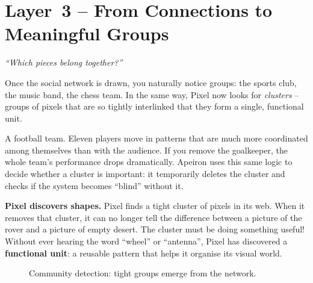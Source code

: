 \section{Layer~3 – From Connections to Meaningful Groups}
\label{sec:layer3}

\begin{tcolorbox}[colback=blue!5, colframe=blue!60, title=\textbf{Superpower: The Grouper}]
\begin{center}
\textit{“Which pieces belong together?”}
\end{center}
\end{tcolorbox}

Once the social network is drawn, you naturally notice groups: the
sports club, the music band, the chess team.  In the same way, Pixel
now looks for \emph{clusters} – groups of pixels that are so tightly
interlinked that they form a single, functional unit.

\begin{tcolorbox}[colback=yellow!5, colframe=yellow!80, title=Real‑life analogy]
A football team.  Eleven players move in patterns that are much more
coordinated among themselves than with the audience.  If you remove the
goalkeeper, the whole team’s performance drops dramatically.  Apeiron
uses this same logic to decide whether a cluster is important: it
temporarily deletes the cluster and checks if the system becomes
“blind” without it.
\end{tcolorbox}

\textbf{Pixel discovers shapes.}
Pixel finds a tight cluster of pixels in its web.  When it removes that
cluster, it can no longer tell the difference between a picture of the
rover and a picture of empty desert.  The cluster must be doing
something useful!  Without ever hearing the word “wheel” or “antenna”,
Pixel has discovered a \textbf{functional unit}: a reusable pattern
that helps it organise its visual world.

\begin{figure}[ht]
\centering
{}
\caption{Community detection: tight groups emerge from the network.}
\label{fig:clusters}
\end{figure}

